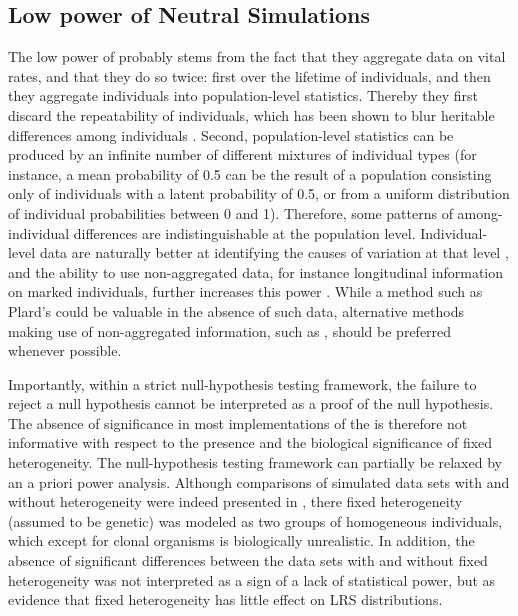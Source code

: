 \subsection{Low power of Neutral Simulations}
The low power of \NSM probably stems from the fact that they aggregate data on vital rates, and that they do so twice: first over the lifetime of individuals, and then they aggregate individuals into population-level statistics. Thereby they first discard the repeatability of individuals, which has been shown to blur heritable differences among individuals \parencite{Vaupel1988}. Second, population-level statistics can be produced by an infinite number of different mixtures of individual types (for instance, a mean probability of 0.5 can be the result of a population consisting only of individuals with a latent probability of 0.5, or from a uniform distribution of individual probabilities between 0 and 1). Therefore, some patterns of among-individual differences are indistinguishable at the population level. Individual-level data are naturally better at identifying the causes of variation at that level \parencite{Clutton-brock2010}, and the ability to use non-aggregated data, for instance longitudinal information on marked individuals, further increases this power \parencite{Brooks2013}. While a method such as Plard's \NSM could be valuable in the absence of such data, alternative methods making use of non-aggregated information, such as \MM, should be preferred whenever possible.

Importantly, within a strict null-hypothesis testing framework, the failure to reject a null hypothesis cannot be interpreted as a proof of the null hypothesis. The absence of significance in most implementations of the \NSM \parencite{Steiner2010,Orzack2011,Tuljapurkar2009,Plard2012} is therefore not informative with respect to the presence and the biological significance of fixed heterogeneity. The null-hypothesis testing framework can partially be relaxed by an a priori power analysis. Although comparisons of simulated data sets with and without heterogeneity were indeed presented in \cite{Steiner2012}, there fixed heterogeneity (assumed to be genetic) was modeled as two groups of homogeneous individuals, which except for clonal organisms is biologically unrealistic. In addition, the absence of significant differences between the data sets with and without fixed heterogeneity was not interpreted as a sign of a lack of statistical power, but as evidence that fixed heterogeneity has little effect on LRS distributions. 

